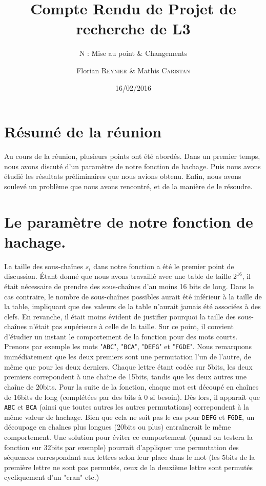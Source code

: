\documentclass[final,twoside,article,10pt]{scrartcl}
\begin{document}
%
\title{Compte Rendu de Projet de recherche de L3}
\subtitle{N : Mise au point \& Changements}
\author{Florian \textsc{Reynier} \& Mathis \textsc{Caristan}}
%
\date{16/02/2016}

\maketitle

\section*{Résumé de la réunion}
    Au cours de la réunion, plusieurs points ont été abordés.
    Dans un premier temps, nous avons discuté d'un paramètre de notre fonction de hachage.
    Puis nous avons étudié les résultats préliminaires que nous avions obtenu.
    Enfin, nous avons soulevé un problème que nous avons rencontré, et de la manière de le résoudre.

\section{Le paramètre de notre fonction de hachage.}
    La taille des sous-chaînes $s_i$ dans notre fonction a été le premier point de discussion.
    \'Etant donné que nous avons travaillé avec une table de taille $2^{16}$, il était nécessaire de prendre des sous-chaînes d'au moins 16 bits de long. Dans le cas contraire, le nombre de sous-chaînes possibles aurait été inférieur à la taille de la table, impliquant que des valeurs de la table n'aurait jamais été associées à des clefs.
    En revanche, il était moins évident de justifier pourquoi la taille des sous-chaînes n'était pas supérieure à celle de la taille.
    Sur ce point, il convient d'étudier un instant le comportement de la fonction pour des mots courts.
    Prenons par exemple les mots "\texttt{ABC}", "\texttt{BCA}", "\texttt{DEFG}" et "\texttt{FGDE}". Nous remarquons immédiatement que les deux premiers sont une permutation l'un de l'autre, de même que pour les deux derniers.
    Chaque lettre étant codée sur 5bits, les deux premiers correpondent à une chaîne de 15bits, tandis que les deux autres une chaîne de 20bits.
    Pour la suite de la fonction, chaque mot est découpé en chaînes de 16bits de long (complétées par des bits à 0 si besoin).
    Dès lors, il apparaît que \texttt{ABC} et \texttt{BCA} (ainsi que toutes autres les autres permutations) correpondent à la même valeur de hachage.
    Bien que cela ne soit pas le cas pour \texttt{DEFG} et \texttt{FGDE}, un découpage en chaînes plus longues (20bits ou plus) entraînerait le même comportement.
    Une solution pour éviter ce comportement (quand on testera la fonction sur 32bits par exemple) pourrait d'appliquer une permutation des séquences correspondant aux lettres selon leur place dans le mot (les 5bits de la première lettre ne sont pas permutés, ceux de la deuxième lettre sont permutés cycliquement d'un "cran" etc.) 
\end{document}
